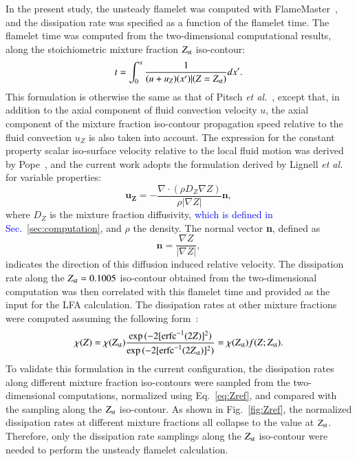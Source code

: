 \documentclass[review,3p,times]{elsarticle}
\begin{document}
In the present study, the unsteady flamelet was computed with FlameMaster~\cite{flamemaster}, and the dissipation rate was specified as a function of the flamelet time.  The flamelet time was computed from the two-dimensional computational results, along the stoichiometric mixture fraction $Z_{\rm st}$ iso-contour: 
 \begin{equation} \label{eq:t}
t = \int ^{x}_{0} \frac{1}{(u + u_Z)(x')|(Z=Z_{\rm st})} dx'.
\end{equation}
This formulation is otherwise the same as that of Pitsch \emph {et al.}~\cite{pitsch98a}, except that, in addition to the axial component of fluid convection velocity $u$, the axial component of the mixture fraction iso-contour propagation speed relative to the fluid convection $u_Z$ is also taken into account.  The expression for the constant property scalar iso-surface velocity relative to the local fluid motion was derived by Pope~\cite{pope88}, and the current work adopts the formulation derived by Lignell \emph {et al.}~\cite{lignell07} for variable properties:
\begin{equation}
\mathbf{u_Z} = -\frac{\nabla \cdot (\rho D_Z \nabla Z) }{\rho |\nabla Z|} \mathbf{n},
\end{equation}  
where $D_Z$ is the mixture fraction diffusivity, \textcolor{blue}{which is defined in Sec.~\ref{sec:computation}}, and $\rho$ the density.  The normal vector \textbf{n}, defined as
\begin{equation}
\mathbf{n} = \frac{\nabla Z}{|\nabla Z|},
\end{equation}
indicates the direction of this diffusion induced relative velocity.
The dissipation rate along the $Z_{\rm st} = 0.1005$ iso-contour obtained from the two-dimensional computation was then correlated with this flamelet time and provided as the input for the LFA calculation.  The dissipation rates at other mixture fractions were computed assuming the following form~\cite{petersbook}:
\begin{equation} \label{eq:Zref}
\chi{(Z)} = \chi{(Z_{\rm st})} \frac{\exp{(-2[{\rm erfc}^{-1}(2Z)]^2)}}{\exp{(-2[{\rm erfc}^{-1}(2Z_{\rm st})]^2)}} = \chi{(Z_{\rm st})} f(Z;Z_{\rm st}).
\end{equation}
To validate this formulation in the current configuration, the dissipation rates along different mixture fraction iso-contours were sampled from the two-dimensional computations, normalized using Eq.~\ref{eq:Zref}, and compared with the sampling along the $Z_{\rm st}$ iso-contour.  As shown in Fig.~\ref{fig:Zref}, the normalized dissipation rates at different mixture fractions all collapse to the value at $Z_{\rm st}$.  Therefore, only the dissipation rate samplings along the $Z_{\rm st}$ iso-contour were needed to perform the unsteady flamelet calculation.
\end{document}
